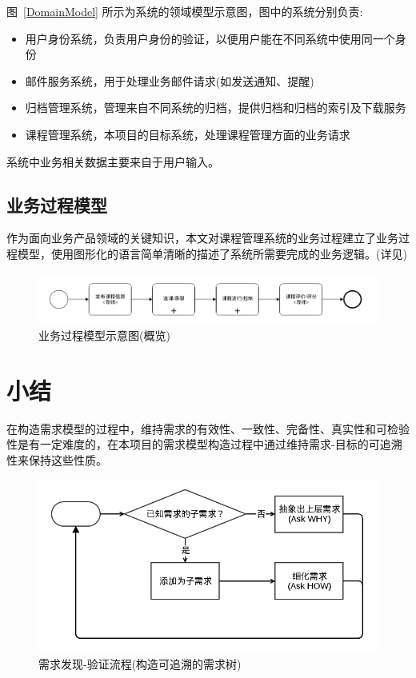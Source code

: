 图~\ref{DomainModel} 所示为系统的领域模型示意图，图中的系统分别负责:

\begin{itemize}
\item 用户身份系统，负责用户身份的验证，以便用户能在不同系统中使用同一个身份
\item 邮件服务系统，用于处理业务邮件请求(如发送通知、提醒)
\item 归档管理系统，管理来自不同系统的归档，提供归档和归档的索引及下载服务
\item 课程管理系统，本项目的目标系统，处理课程管理方面的业务请求
\end{itemize}

系统中业务相关数据主要来自于用户输入。

\subsection{业务过程模型}

作为面向业务产品领域的关键知识，本文对课程管理系统的业务过程建立了业务过程模型，使用图形化的语言简单清晰的描述了系统所需要完成的业务逻辑。(详见\quad {})

\begin{figure}[!hbp]
  \begin{center}
    \includegraphics[scale=0.5]{figures/diagram-bpm-overview.png}
    \caption{业务过程模型示意图(概览)\label{BPMOverview}}
  \end{center}
\end{figure}

\section{小结}

在构造需求模型的过程中，维持需求的有效性、一致性、完备性、真实性和可检验性是有一定难度的，在本项目的需求模型构造过程中通过维持需求-目标的可追溯性来保持这些性质。

\begin{figure}[!hbp]
  \begin{center}
    \includegraphics[scale=0.5]{figures/diagram-requirement-workflow.png}
    \caption{需求发现-验证流程(构造可追溯的需求树)\label{RequirementExtraction}}
  \end{center}
\end{figure}

